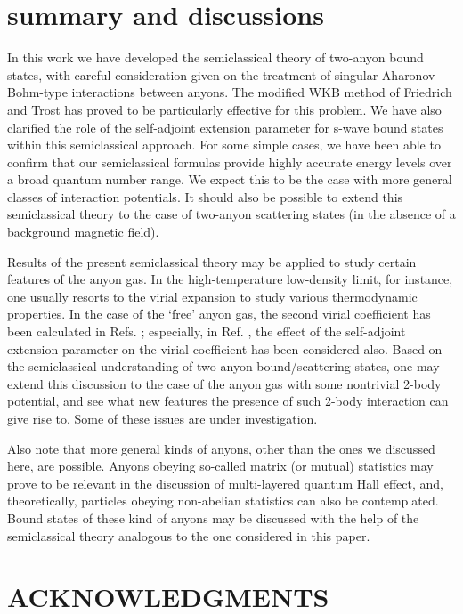 \documentclass[a4paper,aps,eqsecnum,preprint,preprintnumbers,12pt]{revtex4}
\begin{document}
\section{summary and discussions}

In this work we have developed the semiclassical theory of
two-anyon bound states, with careful consideration given on the
treatment of singular Aharonov-Bohm-type interactions between
anyons. The modified WKB method of Friedrich and Trost has proved
to be particularly effective for this problem. We have also
clarified the role of the self-adjoint extension parameter for
s-wave bound states within this semiclassical approach. For some
simple cases, we have been able to confirm that our semiclassical
formulas provide highly accurate energy levels over a broad
quantum number range. We expect this to be the case with more
general classes of interaction potentials. It should also be
possible to extend this semiclassical theory to the case of
two-anyon scattering states (in the absence of a background
magnetic field).

Results of the present semiclassical theory may be applied to
study certain features of the anyon gas. In the high-temperature
low-density limit, for instance, one usually resorts to the virial
expansion to study various thermodynamic properties. In the case
of the `free' anyon gas, the second virial coefficient has been
calculated in Refs. \cite{arovas2, moroz, kim3}; especially, in
Ref. \cite{kim3}, the effect of the self-adjoint extension
parameter on the virial coefficient has been considered also.
Based on the semiclassical understanding of two-anyon
bound/scattering states, one may extend this discussion to the
case of the anyon gas with some nontrivial 2-body potential, and
see what new features the presence of such 2-body interaction can
give rise to. Some of these issues are under investigation.

Also note that more general kinds of anyons, other than the ones
we discussed here, are possible. Anyons obeying so-called matrix
(or mutual) statistics \cite{wen, kim4} may prove to be relevant
in the discussion of multi-layered quantum Hall effect, and,
theoretically, particles obeying non-abelian statistics
\cite{wilczek2, bak} can also be contemplated. Bound states of
these kind of anyons may be discussed with the help of the
semiclassical theory analogous to the one considered in this
paper.

\section*{ACKNOWLEDGMENTS}
\end{document}
